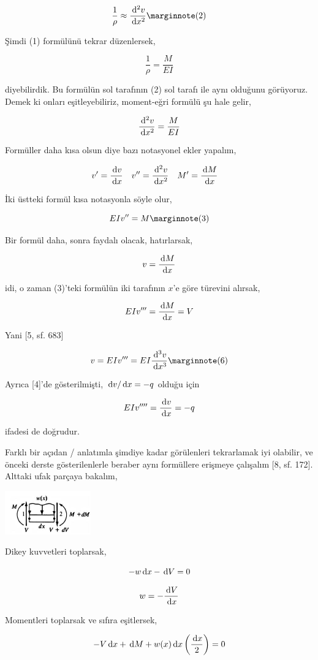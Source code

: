 \documentclass[12pt,fleqn]{article}\usepackage{../../common}
\begin{document}
$$
\frac{1}{\rho} \approx \frac{\ud^2 v}{\ud x^2}
\mlabel{2}
$$

Şimdi (1) formülünü tekrar düzenlersek,

$$
\frac{1}{\rho} = \frac{M}{EI }
$$

diyebilirdik. Bu formülün sol tarafının (2) sol tarafı ile aynı olduğunu
görüyoruz. Demek ki onları eşitleyebiliriz, moment-eğri formülü şu hale gelir,

$$
\frac{\,\mathrm{d}^2 v}{\,\mathrm{d} x^2} = \frac{M}{E I}
$$

Formüller daha kısa olsun diye bazı notasyonel ekler yapalım,

$$
v' = \frac{\,\mathrm{d} v}{\,\mathrm{d} x} \quad 
v'' = \frac{\,\mathrm{d}^2 v}{\,\mathrm{d} x^2} \quad 
M' = \frac{\,\mathrm{d} M}{\,\mathrm{d} x} \quad 
$$

İki üstteki formül kısa notasyonla söyle olur,

$$
EI v'' = M
\mlabel{3}
$$

Bir formül daha, sonra faydalı olacak, hatırlarsak,

$$
v = \frac{\,\mathrm{d} M}{\,\mathrm{d} x}
$$

idi, o zaman (3)'teki formülün iki tarafının $x$'e göre türevini alırsak,

$$
EI v''' = \frac{\,\mathrm{d} M}{\,\mathrm{d} x} = V
$$

Yani [5, sf. 683]

$$
v = EI v''' = EI \frac{\ud^3 v}{\ud x^3}
\mlabel{6}
$$

Ayrıca [4]'de gösterilmişti, $\,\mathrm{d} v / \,\mathrm{d} x = -q$ olduğu için

$$
EI v'''' = \frac{\,\mathrm{d} v}{\,\mathrm{d} x} = -q
$$

ifadesi de doğrudur.

Farklı bir açıdan / anlatımla şimdiye kadar görülenleri tekrarlamak iyi
olabilir, ve önceki derste gösterilenlerle beraber aynı formüllere erişmeye 
çalışalım [8, sf. 172]. Alttaki ufak parçaya bakalım,

\includegraphics[width=10em]{phy_020_strs_03_07.jpg}

Dikey kuvvetleri toplarsak,

$$
-w \,\mathrm{d} x - \,\mathrm{d} V = 0 
$$

$$
w = -\frac{\,\mathrm{d} V}{\,\mathrm{d} x}
$$

Momentleri toplarsak ve sıfıra eşitlersek,

$$
-V \,\mathrm{d} x + \,\mathrm{d} M + w(x) \,\mathrm{d} x \left( \frac{\,\mathrm{d} x}{2}  \right) = 0
$$
\end{document}
